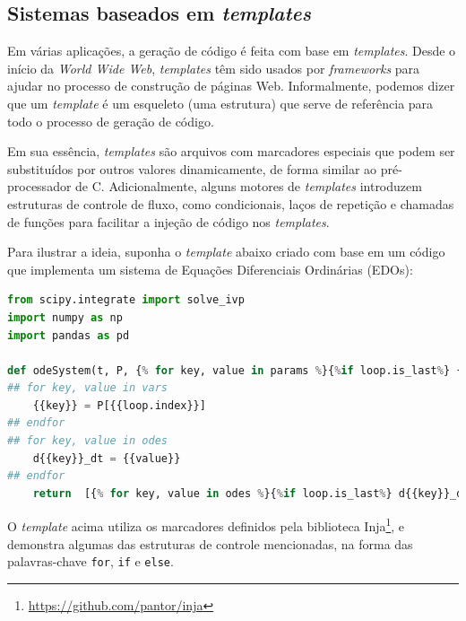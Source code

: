 \documentclass[
	12pt,				%
	openright,			%
	oneside,			%
	a4paper,			%
	main=brazil,
	english,			%
	]{ufsj-abntex2}
\begin{document}
\subsection{Sistemas baseados em \textit{templates}}
 
Em várias aplicações, a geração de código é feita com base em \textit{templates}. Desde o início da \textit{World Wide Web}, \textit{templates} têm sido usados por \textit{frameworks} para ajudar no processo de construção de páginas Web. Informalmente, podemos dizer que um \textit{template} é um esqueleto (uma estrutura) que serve de referência para todo o processo de geração de código.

Em sua essência, \textit{templates} são arquivos com marcadores especiais que podem ser substituídos por outros valores dinamicamente, de forma similar ao pré-processador de C. Adicionalmente, alguns motores de \textit{templates} introduzem estruturas de controle de fluxo, como condicionais, laços de repetição e chamadas de funções para facilitar a injeção de código nos \textit{templates}.  

Para ilustrar a ideia, suponha o \textit{template} abaixo criado com base em um código que implementa um sistema de Equações Diferenciais Ordinárias (EDOs):  

\begin{lstlisting}[language=Python, firstnumber=1]
from scipy.integrate import solve_ivp
import numpy as np
import pandas as pd

def odeSystem(t, P, {% for key, value in params %}{%if loop.is_last%} {{key}} {%else%} {{key}}, {%endif%}{%endfor%}):
## for key, value in vars
    {{key}} = P[{{loop.index}}]
## endfor
## for key, value in odes
    d{{key}}_dt = {{value}}
## endfor     
    return  [{% for key, value in odes %}{%if loop.is_last%} d{{key}}_dt {%else%} d{{key}}_dt, {%endif%}{%endfor%}]
\end{lstlisting}

O \textit{template} acima utiliza os marcadores definidos pela biblioteca Inja\footnote{\href{https://github.com/pantor/inja}{https://github.com/pantor/inja}}, e demonstra algumas das estruturas de controle mencionadas, na forma das palavras-chave \texttt{\textcolor{codepurple}{for}}, \texttt{\textcolor{codepurple}{if}} e \texttt{\textcolor{codepurple}{else}}.

\end{document}
